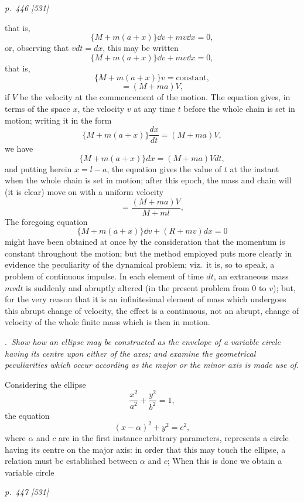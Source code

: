\documentclass[11pt,a4paper]{book}
\begin{document}
\clearpage

\bigskip
\textit{p.~446 [531]}
\smallskip

that is,
\[
\{M+m(a+x)\}\dd v + mv\dd x = 0,
\]
or, observing that $vdt = dx$, this may be written
\[
\{M+m(a+x)\}\dd v + mv\dd x = 0,
\]
that is,
\[
\{M+m(a+x)\}v = \text{constant},
\]
\[
= (M+ma)V,
\]
if $V$ be the velocity at the commencement of the motion. The equation gives, in
terms of the space $x$, the velocity $v$ at any time $t$ before the whole chain is set in
motion; writing it in the form
\[
\{M+m(a+x)\}\frac{dx}{dt} = (M+ma)V,
\]
we have
\[
\{M+m(a+x)\}dx = (M+ma)Vdt,
\]
and putting herein $x = l - a$, the equation gives the value of $t$ at the instant when
the whole chain is set in motion; after this epoch, the mass and chain will (it is
clear) move on with a uniform velocity
\[
= \frac{(M+ma)V}{M+ml},
\]
The foregoing equation
\[
\{M+m(a+x)\}\dd v + (R+mv)dx = 0
\]
might have been obtained at once by the consideration that the momentum is constant
throughout the motion; but the method employed puts more clearly in evidence the
peculiarity of the dynamical problem; viz.\ it is, so to speak, a problem of continuous
impulse. In each element of time $dt$, an extraneous mass $mvdt$ is suddenly and
abruptly altered (in the present problem from $0$ to $v$); but, for the very reason that
it is an infinitesimal element of mass which undergoes this abrupt change of velocity,
the effect is a continuous, not an abrupt, change of velocity of the whole finite mass
which is then in motion.

\medskip
{}.\ \textit{Show how an ellipse may be constructed as the envelope of a variable circle
having its centre upon either of the axes; and examine the geometrical peculiarities which
occur according as the major or the minor axis is made use of.}

\medskip
Considering the ellipse
\[
\frac{x^2}{a^2} + \frac{y^2}{b^2} = 1,
\]
the equation
\[
(x - \alpha)^2 + y^2 = c^2,
\]
where $\alpha$ and $c$ are in the first instance arbitrary parameters, represents a circle having
its centre on the major axis: in order that this may touch the ellipse, a relation
must be established between $\alpha$ and $c$; When this is done we obtain a variable circle

\clearpage

\bigskip
\textit{p.~447 [531]}
\smallskip
\end{document}
